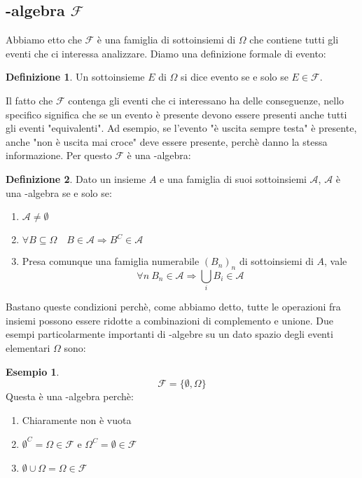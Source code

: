 \documentclass{article}
\theoremstyle{plain}
\theoremstyle{definition}
\newtheorem{definizione}{Definizione}[section]
\newtheorem{esempio}{Esempio}[section]
\theoremstyle{remark}
\begin{document}
\subsection{\sigma-algebra $\mathscr{F}$} %
\label{sub:sigma_algebra_f}
Abbiamo etto che $\mathscr{F}$ è una famiglia di sottoinsiemi di $\Omega$ che contiene tutti gli eventi che ci interessa analizzare. Diamo una definizione formale di evento:
\begin{definizione}
	Un sottoinsieme $E$ di $\Omega$ si dice evento se e solo se $E\in\mathscr{F}$.
\end{definizione}
Il fatto che $\mathscr{F}$ contenga gli eventi che ci interessano ha delle conseguenze, nello specifico significa che se un evento è presente devono essere presenti anche tutti gli eventi "equivalenti". Ad esempio, se l'evento "è uscita sempre testa" è presente, anche "non è uscita mai croce" deve essere presente, perchè danno la stessa informazione. Per questo $\mathscr{F}$ è una \sigma-algebra:
\begin{definizione}
	Dato un insieme $A$ e una famiglia di suoi sottoinsiemi $\mathcal{A}$, $\mathcal{A}$ è una \sigma-algebra se e solo se:
	\begin{enumerate}
		\item $\mathcal{A}\neq\emptyset$
		\item $\forall B\subseteq\Omega\quad B\in\mathcal{A}\Rightarrow B^C\in\mathcal{A}$
		\item Presa comunque una famiglia numerabile $(B_n)_n$ di sottoinsiemi di $A$, vale
		\begin{equation*}
			\forall n\ B_n\in\mathcal{A}\Rightarrow\bigcup_i B_i\in\mathcal{A}
		\end{equation*}
	\end{enumerate}
\end{definizione}
Bastano queste condizioni perchè, come abbiamo detto, tutte le operazioni fra insiemi possono essere ridotte a combinazioni di complemento e unione. Due esempi particolarmente importanti di \sigma-algebre su un dato spazio degli eventi elementari $\Omega$ sono:
\begin{esempio}
	\begin{equation*}
		\mathscr{F}=\{\emptyset, \Omega\}
	\end{equation*}
	Questa è una \sigma-algebra perchè:
	\begin{enumerate}
		\item Chiaramente non è vuota
		\item $\emptyset^C=\Omega\in\mathscr{F}$ e $\Omega^C=\emptyset\in\mathscr{F}$
		\item $\emptyset\cup\Omega=\Omega\in\mathscr{F}$
	\end{enumerate}
\end{esempio}
\end{document}
